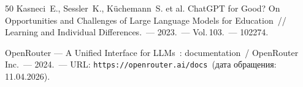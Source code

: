 \begin{thebibliography}{50}
Kasneci~E., Sessler~K., K{\"u}chemann~S. et al.
ChatGPT for Good? On Opportunities and Challenges of Large Language Models for Education~/\!/
Learning and Individual Differences.~---
2023.~--- Vol.\,103.~--- 102274.

OpenRouter --- A Unified Interface for LLMs~: documentation~/
OpenRouter Inc.~--- 2024.~--- URL: \texttt{https://openrouter.ai/docs}~(дата обращения: 11.04.2026).

\end{thebibliography}
